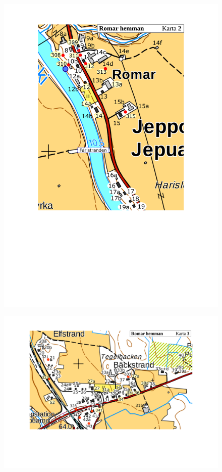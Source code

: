 \begin{figure}[htbp]
  \centering
  \includegraphics[width=1\textwidth]{kartor/Karta2.pdf}
  \label{map:2}
\end{figure}

\begin{figure}[htbp]
  \centering
  \includegraphics[width=1\textwidth]{kartor/Karta3.pdf}
  \label{map:3}
\end{figure}

